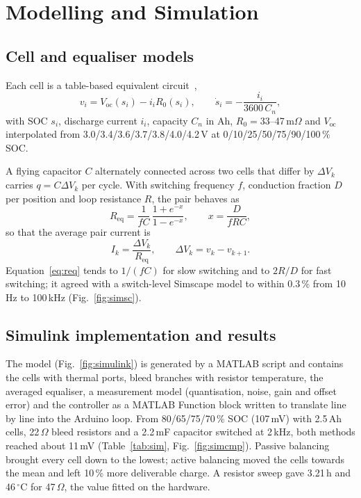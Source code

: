 \documentclass[conference]{IEEEtran}
\begin{document}
\section{Modelling and Simulation}
\label{sec:sim}

\subsection{Cell and equaliser models}
Each cell is a table-based equivalent circuit~\cite{plett2015},
\begin{equation}
v_i = V_\text{oc}(s_i) - i_i R_0(s_i), \qquad \dot s_i = -\frac{i_i}{3600\,C_n},
\label{eq:cell}
\end{equation}
with SOC $s_i$, discharge current $i_i$, capacity $C_n$ in Ah, $R_0=33$--47\,m$\Omega$ and $V_\text{oc}$
interpolated from 3.0/3.4/3.6/3.7/3.8/4.0/4.2\,V at 0/10/25/50/75/90/100\,\% SOC.

A flying capacitor $C$ alternately connected across two cells that differ by $\Delta V_k$ carries $q=C\Delta V_k$
per cycle. With switching frequency $f$, conduction fraction $D$ per position and loop resistance $R$, the pair
behaves as~\cite{seeman2008,benyaakov2012}
\begin{equation}
R_\text{eq}=\frac{1}{fC}\,\frac{1+e^{-x}}{1-e^{-x}},\qquad x=\frac{D}{fRC},
\label{eq:req}
\end{equation}
so that the average pair current is
\begin{equation}
I_k=\frac{\Delta V_k}{R_\text{eq}}, \qquad \Delta V_k=v_k-v_{k+1}.
\label{eq:ipair}
\end{equation}
Equation~\eqref{eq:req} tends to $1/(fC)$ for slow switching and to $2R/D$ for fast switching; it agreed with a
switch-level Simscape model to within 0.3\,\% from 10\,Hz to 100\,kHz (Fig.~\ref{fig:simsc}).

\subsection{Simulink implementation and results}
The model (Fig.~\ref{fig:simulink}) is generated by a MATLAB script and contains the cells with thermal ports,
bleed branches with resistor temperature, the averaged equaliser, a measurement model (quantisation, noise, gain
and offset error) and the controller as a MATLAB Function block written to translate line by line into the Arduino
loop. From 80/65/75/70\,\% SOC (107\,mV) with 2.5\,Ah cells, 22\,$\Omega$ bleed resistors and a 2.2\,mF capacitor
switched at 2\,kHz, both methods reached about 11\,mV (Table~\ref{tab:sim}, Fig.~\ref{fig:simcmp}). Passive
balancing brought every cell down to the lowest; active balancing moved the cells towards the mean and left 10\,\%
more deliverable charge. A resistor sweep gave 3.21\,h and 46\,$^\circ$C for 47\,$\Omega$, the value fitted on the
hardware.
\end{document}
